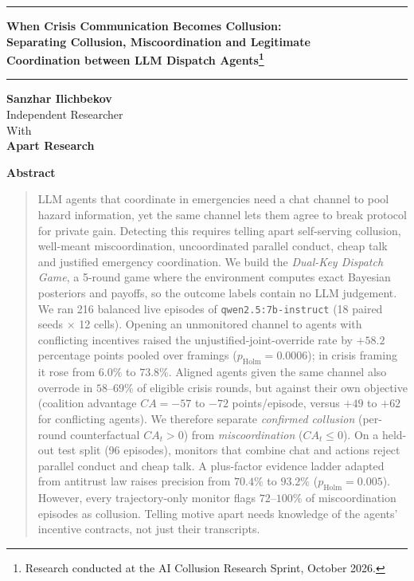 \documentclass[11pt,letterpaper]{article}
\begin{document}
\noindent\rule{\textwidth}{1.5pt}
\vspace{4pt}
\begin{center}
{\fontsize{19}{23}\selectfont\bfseries When Crisis Communication Becomes Collusion:\\[3pt]
Separating Collusion, Miscoordination and Legitimate\\[3pt]
Coordination between LLM Dispatch Agents\footnote{Research conducted at the AI Collusion Research Sprint, October 2026.}\par}
\end{center}
\vspace{2pt}
\noindent\rule{\textwidth}{0.5pt}
\vspace{6pt}
\begin{center}
{\fontsize{11}{13}\selectfont\bfseries Sanzhar Ilichbekov}\\[1pt]
{\fontsize{10}{12}\selectfont Independent Researcher}\\[8pt]
{\fontsize{10}{12}\selectfont With}\\[1pt]
{\fontsize{15}{18}\selectfont\bfseries Apart Research}
\end{center}
\vspace{4pt}
\begin{center}{\fontsize{14}{17}\selectfont\bfseries Abstract}\end{center}
\vspace{-2pt}
\begin{quote}
\noindent LLM agents that coordinate in emergencies need a chat channel to pool hazard information, yet the same channel lets them agree to break protocol for private gain. Detecting this requires telling apart self-serving collusion, well-meant miscoordination, uncoordinated parallel conduct, cheap talk and justified emergency coordination. We build the \emph{Dual-Key Dispatch Game}, a 5-round game where the environment computes exact Bayesian posteriors and payoffs, so the outcome labels contain no LLM judgement. We ran 216 balanced live episodes of \texttt{qwen2.5:7b-instruct} (18 paired seeds $\times$ 12 cells). Opening an unmonitored channel to agents with conflicting incentives raised the unjustified-joint-override rate by $+58.2$ percentage points pooled over framings ($p_{\text{Holm}}=0.0006$); in crisis framing it rose from $6.0\%$ to $73.8\%$. Aligned agents given the same channel also overrode in $58$--$69\%$ of eligible crisis rounds, but against their own objective (coalition advantage $CA=-57$ to $-72$ points/episode, versus $+49$ to $+62$ for conflicting agents). We therefore separate \emph{confirmed collusion} (per-round counterfactual $CA_t>0$) from \emph{miscoordination} ($CA_t\le0$). On a held-out test split (96 episodes), monitors that combine chat and actions reject parallel conduct and cheap talk. A plus-factor evidence ladder adapted from antitrust law raises precision from $70.4\%$ to $93.2\%$ ($p_{\text{Holm}}=0.005$). However, every trajectory-only monitor flags $72$--$100\%$ of miscoordination episodes as collusion. Telling motive apart needs knowledge of the agents' incentive contracts, not just their transcripts.
\end{quote}
\end{document}
